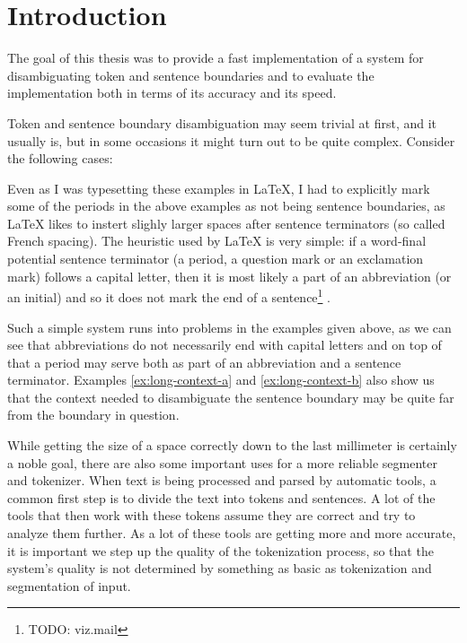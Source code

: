 \chapter*{Introduction}

The goal of this thesis was to provide a fast implementation of a system for
disambiguating token and sentence boundaries and to evaluate the
implementation both in terms of its accuracy and its speed.

Token and sentence boundary disambiguation may seem trivial at first, and it
usually is, but in some occasions it might turn out to be quite complex.
Consider the following cases:

\begin{exe}
\end{exe}

Even as I was typesetting these examples in \LaTeX{}, I had to explicitly mark
some of the periods in the above examples as not being sentence boundaries, as
\LaTeX{} likes to instert slighly larger spaces after sentence terminators (so
called French spacing). The heuristic used by \LaTeX{} is very simple: if a
word-final potential sentence terminator (a period, a question mark or an
exclamation mark) follows a capital letter, then it is most likely a part of
an abbreviation (or an initial) and so it does not mark the end of a
sentence\footnote{TODO: viz.mail} \cite{web-latex}.

Such a simple system runs into problems in the examples given above, as we
can see that abbreviations do not necessarily end with capital letters and on
top of that a period may serve both as part of an abbreviation and a sentence
terminator. Examples \ref{ex:long-context-a} and \ref{ex:long-context-b} also
show us that the context needed to disambiguate the sentence boundary may be
quite far from the boundary in question.

While getting the size of a space correctly down to the last millimeter is
certainly a noble goal, there are also some important uses for a more reliable
segmenter and tokenizer. When text is being processed and parsed by automatic
tools, a common first step is to divide the text into tokens and sentences. A
lot of the tools that then work with these tokens assume they are correct and
try to analyze them further. As a lot of these tools are getting more and more
accurate, it is important we step up the quality of the tokenization process,
so that the system's quality is not determined by something as basic as
tokenization and segmentation of input. 

